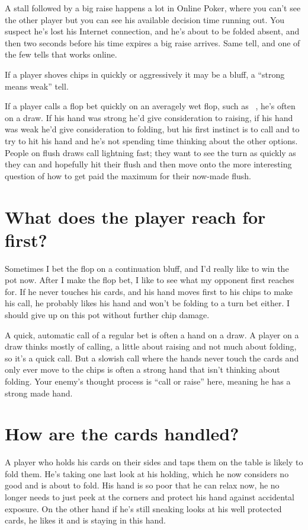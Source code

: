 A stall followed by a big raise happens a lot in Online Poker,
where you can't see the other player but you can see his available
decision time running out. You suspect he's lost his Internet connection,
and he's about to be folded absent, and then two seconds before his time
expires a big raise arrives. Same tell, and one of the few tells
that works online.

If a player shoves chips in quickly or aggressively it may be a bluff,
a ``strong means weak'' tell.

If a player calls a flop bet quickly on an averagely wet flop, such
as \Jd\ninec\fourd\ , he's often on a draw. If his hand was strong he'd
give consideration to raising, if his hand was weak he'd give
consideration to folding, but his first instinct is to call and to try
to hit his hand and he's not spending time thinking about the other
options. People on flush draws call lightning fast; they want to see
the turn as quickly as they can and hopefully hit their flush and then
move onto the more interesting question of how to get paid the maximum
for their now-made flush.

\section{What does the player reach for first?}

Sometimes I bet the flop on a continuation bluff, and I'd really like
to win the pot now. After I make the flop bet, I like to see what
my opponent first reaches for. If he never touches his cards, and his
hand moves first to his chips to make his call, he probably likes his
hand and won't be folding to a turn bet either. I should
give up on this pot without further chip damage.

A quick, automatic call of a regular bet is often a hand on a
draw. A player on a draw thinks mostly of calling, a little about raising
and not much about folding, so it's a quick call. But a slowish call
where the hands never touch the cards and only ever move to the chips
is often a strong hand that isn't thinking about folding. Your enemy's
thought process is ``call or raise'' here, meaning he has a strong
made hand.

\section{How are the cards handled?}

A player who holds his cards on their sides and taps them on
the table is likely to fold them. He's taking one last look
at his holding, which he now considers no good and is about
to fold. His hand is so poor that he can relax now, he no longer
needs to just peek at the corners and protect his hand against
accidental exposure. On the other hand if he's still sneaking looks at
his well protected cards, he likes it and is staying in this hand.

